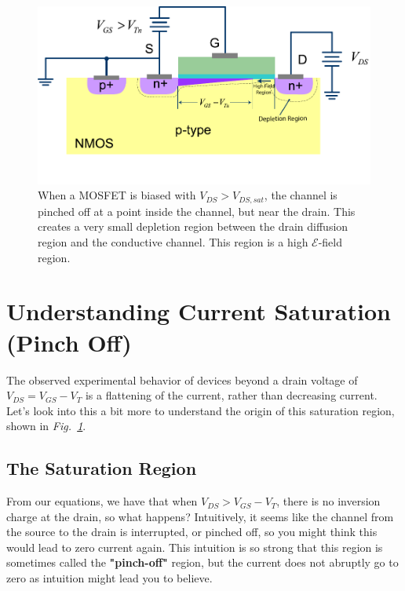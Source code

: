 \newpage
\begin{figure}[t]
\centering
\includegraphics[width=\columnwidth]{mos_current_sat}
\caption{When a MOSFET is biased with $V_{DS} > V_{DS,sat}$, the channel is pinched off at a point inside the channel, but near the drain.  This creates a very small depletion region between the drain diffusion region and the conductive channel.  This region is a high $\mathcal{E}$-field region.}
\label{fig:mos_current_sat}
\end{figure}
\section{Understanding Current Saturation (Pinch Off)}
The observed experimental behavior of devices beyond a drain voltage of $V_{DS} = V_{GS} - V_T$ is a flattening of the current, rather than decreasing current.  Let's look into this a bit more to understand the origin of this saturation region, shown in \emph{Fig.~\ref{fig:mos_current_sat}}.
\subsection{The Saturation Region}
From our equations, we have that when $V_{DS} > V_{GS} - V_T$, there is no inversion charge at the drain, so what happens? Intuitively, it seems like the channel from the source to the drain is interrupted, or pinched off, so you might think this would lead to zero current again.  This intuition is so strong that this region is sometimes called the \textbf{"pinch-off"} region, but the current does not abruptly go to zero as intuition might lead you to believe.  
